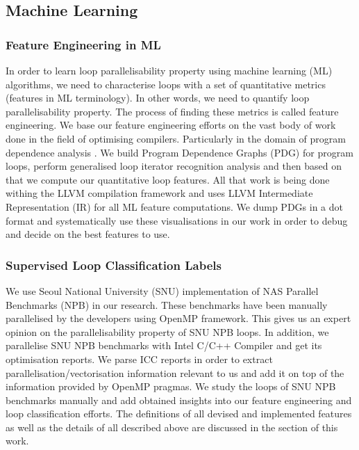 \documentclass[sigconf,10pt,review,anonymous]{acmart}
\begin{document}
\subsection{Machine Learning}

\subsubsection{Feature Engineering in ML}
\quad In order to learn loop parallelisability property using machine learning (ML) algorithms, we need to characterise loops with a set of quantitative metrics (features in ML terminology). In other words, we need to quantify loop parallelisability property. The process of finding these metrics is called feature engineering.\newline
\quad We base our feature engineering efforts on the vast body of work done in the field of optimising compilers. Particularly in the domain of program dependence analysis \cite{Kennedy:2001:OCM:502981}. We build Program Dependence Graphs (PDG) \cite{Ferrante:1987:PDG:24039.24041} for program loops, perform generalised loop iterator recognition analysis \cite{Manilov:2018:GPI:3178372.3179511} and then based on that we compute our quantitative loop features. All that work is being done withing the LLVM compilation framework and uses LLVM Intermediate Representation (IR) for all ML feature computations. We dump PDGs in a dot format and systematically use these visualisations in our work in order to debug and decide on the best features to use.
\subsubsection{Supervised Loop Classification Labels}
\quad We use Seoul National University (SNU) \cite{snu-npb-benchmarks} implementation of NAS Parallel Benchmarks (NPB) \cite{nasa-parallel-benchmarks} in our research. These benchmarks have been manually parallelised by the developers using OpenMP framework. This gives us an expert opinion on the parallelisability property of SNU NPB loops. In addition, we parallelise SNU NPB benchmarks with Intel C/C++ Compiler \cite{icc-compiler} and get its optimisation reports. We parse ICC reports in order to extract parallelisation/vectorisation information relevant to us and add it on top of the information provided by OpenMP pragmas. We study the loops of SNU NPB benchmarks manually and add obtained insights into our feature engineering and loop classification efforts.\newline
\quad The definitions of all devised and implemented features as well as the details of all described above are discussed in the section \label{predicting_parallel_loops} of this work.  
\end{document}
